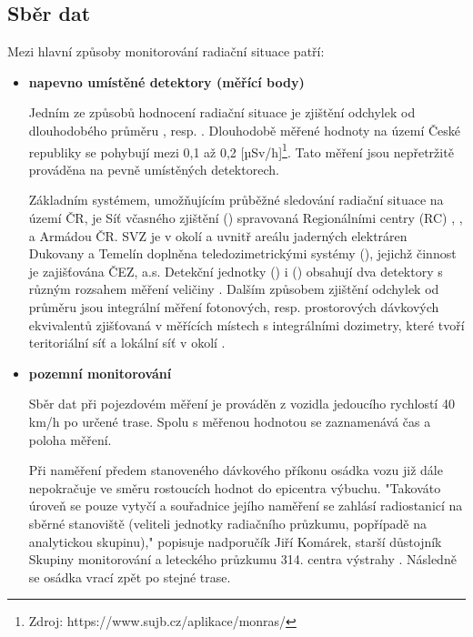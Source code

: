 

\subsection{Sběr dat}	

Mezi hlavní způsoby monitorování radiační situace patří:

\begin{itemize}
	\item \textbf{napevno umístěné detektory (měřící body)}
	
	Jedním ze způsobů hodnocení radiační situace je zjištění odchylek od dlouhodobého průměru , resp. . Dlouhodobě měřené hodnoty  na území České republiky se pohybují mezi 0,1 až 0,2 {[}µSv/h{]}\footnote{Zdroj: https://www.sujb.cz/aplikace/monras/}. Tato měření jsou nepřetržitě prováděna na pevně umístěných detektorech.
	
	Základním systémem, umožňujícím průběžné sledování radiační situace na území ČR, je Síť včasného zjištění () spravovaná Regionálními centry (RC) , ,  a Armádou ČR. SVZ je v okolí a uvnitř areálu jaderných elektráren Dukovany a Temelín doplněna teledozimetrickými systémy (), jejichž činnost je zajišťována ČEZ, a.s. Detekční jednotky () i () obsahují dva detektory s různým rozsahem měření veličiny . Dalším způsobem zjištění odchylek od průměru jsou integrální měření fotonových, resp. prostorových dávkových ekvivalentů zjišťovaná v měřících místech s integrálními dozimetry, které tvoří teritoriální síť a lokální síť v okolí .
		
	\item \textbf{pozemní monitorování}
	
	Sběr dat při pojezdovém měření je prováděn z vozidla jedoucího rychlostí 40 km/h po určené trase. Spolu s měřenou hodnotou se zaznamenává čas a poloha měření.
	
	Při naměření předem stanoveného dávkového příkonu osádka vozu již dále nepokračuje ve směru rostoucích hodnot do epicentra výbuchu. "Takováto úroveň se pouze vytyčí a souřadnice jejího naměření se zahlásí radiostanicí na sběrné stanoviště (veliteli jednotky radiačního průzkumu, popřípadě na analytickou skupinu)," popisuje nadporučík Jiří Komárek, starší důstojník Skupiny monitorování a leteckého průzkumu 314. centra výstrahy . Následně se osádka vrací zpět po stejné trase. 
	

\end{itemize}
